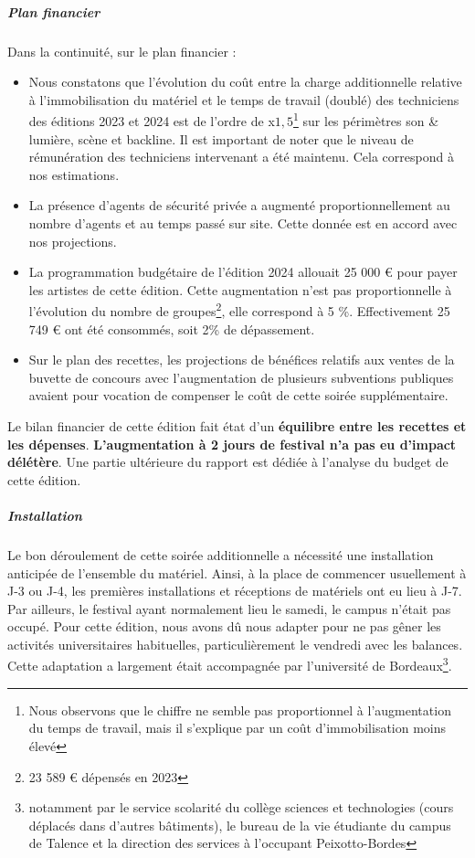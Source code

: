 \documentclass[12pt,a4paper]{report}
\begin{document}
\subparagraph{Plan financier}
Dans la continuité, sur le plan financier :
\begin{itemize}
\item Nous constatons que l'évolution du coût entre la charge additionnelle relative à l'immobilisation du matériel et le temps de travail (doublé) des techniciens des éditions 2023 et 2024 est de l'ordre de x$1,5$\footnote{Nous observons que le chiffre ne semble pas proportionnel à l'augmentation du temps de travail, mais il s'explique par un coût d'immobilisation moins élevé} sur les périmètres son \& lumière, scène et backline. Il est important de noter que le niveau de rémunération des techniciens intervenant a été maintenu. Cela correspond à nos estimations.
\item La présence d'agents de sécurité privée a augmenté proportionnellement au nombre d'agents et au temps passé sur site. Cette donnée est en accord avec nos projections.
\item La programmation budgétaire de l'édition 2024 allouait 25 000 € pour payer les artistes de cette édition. Cette augmentation n'est pas proportionnelle à l'évolution du nombre de groupes\footnote{23 589 € dépensés en 2023}, elle correspond à 5 \%. Effectivement 25 749 € ont été consommés, soit 2\% de dépassement.
\item Sur le plan des recettes, les projections de bénéfices relatifs aux ventes de la buvette de concours avec l'augmentation de plusieurs subventions publiques avaient pour vocation de compenser le coût de cette soirée supplémentaire.\\
\end{itemize}
Le bilan financier de cette édition fait état d'un \textbf{équilibre entre les recettes et les dépenses}. \textbf{L'augmentation à 2 jours de festival n'a pas eu d'impact délétère}. Une partie ultérieure du rapport est dédiée à l'analyse du budget de cette édition.

\subparagraph{Installation}
Le bon déroulement de cette soirée additionnelle a nécessité une installation anticipée de l'ensemble du matériel. Ainsi, à la place de commencer usuellement à J-3 ou J-4, les premières installations et réceptions de matériels ont eu lieu à J-7. Par ailleurs, le festival ayant normalement lieu le samedi, le campus n'était pas occupé. Pour cette édition, nous avons dû nous adapter pour ne pas gêner les activités universitaires habituelles, particulièrement le vendredi avec les balances. Cette adaptation a largement était accompagnée par l'université de Bordeaux\footnote{notamment par le service scolarité du collège sciences et technologies (cours déplacés dans d'autres bâtiments), le bureau de la vie étudiante du campus de Talence et la direction des services à l'occupant Peixotto-Bordes}.
\end{document}
